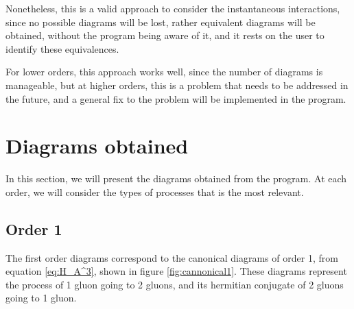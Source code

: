 \documentclass[11pt,a4paper,twoside,pdf]{article}
\numberwithin{equation}{section}
\begin{document}
Nonetheless, this is a valid approach to consider the instantaneous interactions, 
since no possible diagrams will be lost, rather equivalent diagrams will be 
obtained, without the program being aware of it, and it rests on the user to
identify these equivalences. 

For lower orders, this approach works well, since the number of diagrams is
manageable, but at higher orders, this is a problem that needs to be addressed in 
the future, and a general fix to the problem will be implemented in the program.




\newpage

\section{Diagrams obtained} \label{sec:diagrams}

In this section, we will present the diagrams obtained from the program. At 
each order, we will consider the types of processes that is the most relevant.


\subsection{Order 1}

The first order diagrams correspond to the canonical diagrams of order 1, from equation
\eqref{eq:H_A^3}, shown in figure \ref{fig:cannonical1}. These diagrams represent the 
process of 1 gluon going to 2 gluons, and its hermitian conjugate of 2 gluons going to 1 gluon.
\end{document}
